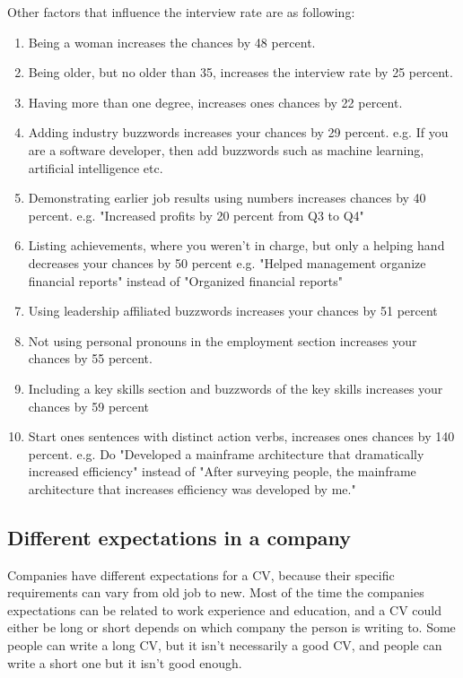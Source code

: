 Other factors that influence the interview rate are as following:
\begin{enumerate}
\item Being a woman increases the chances by 48 percent.
\item Being older, but no older than 35, increases the interview rate by 25 percent.
\item Having more than one degree, increases ones chances by 22 percent.
\item Adding industry buzzwords increases your chances by 29 percent.
   e.g. If you are a software developer, then add buzzwords such as machine learning,
   artificial intelligence etc.
\item Demonstrating earlier job results using numbers increases chances by 40 percent.
   e.g. "Increased profits  by 20 percent from Q3 to Q4"
\item Listing achievements, where you weren't in charge, but only a helping hand
 decreases your chances by 50 percent
   e.g. "Helped management organize financial reports" instead of "Organized financial reports"
\item Using leadership affiliated buzzwords increases your chances by 51 percent
\item Not using personal pronouns in the employment section increases your
chances by 55 percent.
\item Including a key skills section and buzzwords of the key skills increases your
 chances by 59 percent
\item Start ones sentences with distinct action verbs, increases ones chances by 140 percent.
   e.g. Do "Developed a mainframe architecture that dramatically increased efficiency"
   instead of "After surveying people, the mainframe architecture that increases efficiency was
   developed by me."\cite{Science_job}
\end{enumerate}






\subsection{Different expectations in a company}
Companies have different expectations for a CV, because their specific requirements can vary from old job to new.
Most of the time the companies expectations can be related to work experience and education,
and a CV could either be long or short depends on which company the person is writing to. Some people can write a long CV,
but it isn't necessarily a good CV, and people can write a short one but it isn't good enough. \\

